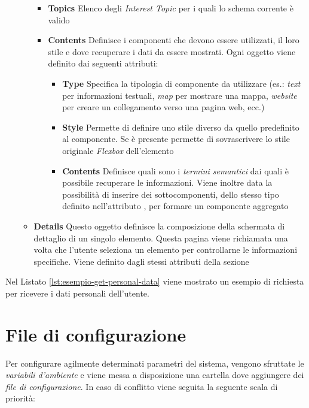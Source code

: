 \begin{itemize}
\begin{itemize}
		\begin{itemize}
			\item \textbf{Topics}
			Elenco degli \emph{Interest Topic} per i quali lo schema corrente è valido
			\item \textbf{Contents}
			Definisce i componenti che devono essere utilizzati, il loro stile e dove recuperare i dati da essere mostrati. Ogni oggetto viene definito dai seguenti attributi:
			\begin{itemize}
				\item \textbf{Type}
				Specifica la tipologia di componente da utilizzare (es.: \emph{text} per informazioni testuali, \emph{map} per mostrare una mappa, \emph{website} per creare un collegamento verso una pagina web, ecc.)
				\item \textbf{Style}
				Permette di definire uno stile diverso da quello predefinito al componente. Se è presente permette di sovrascrivere lo stile originale \emph{Flexbox} dell'elemento
				\item \textbf{Contents}
				Definisce quali sono i \emph{termini semantici} dai quali è possibile recuperare le informazioni. Viene inoltre data la possibilità di inserire dei sottocomponenti, dello stesso tipo definito nell'attributo , per formare un componente aggregato
			\end{itemize}
		\end{itemize}	
		\item \textbf{Details}
		Questo oggetto definisce la composizione della schermata di dettaglio di un singolo elemento. Questa pagina viene richiamata una volta che l'utente seleziona un elemento per controllarne le informazioni specifiche. Viene definito dagli stessi attributi della sezione 			
	\end{itemize}
\end{itemize}

Nel Listato \ref{lst:esempio-get-personal-data} viene mostrato un esempio di richiesta per ricevere i dati personali dell'utente.

\section{File di configurazione\label{sec:file-configurazione}}

Per configurare agilmente determinati parametri del sistema, vengono sfruttate le \emph{variabili d'ambiente} e viene messa a disposizione una cartella dove aggiungere dei \emph{file di configurazione}. In caso di conflitto viene seguita la seguente scala di priorità:

